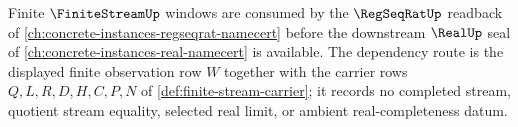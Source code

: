 Finite $\FiniteStreamUp$ windows are consumed by the $\RegSeqRatUp$ readback of \autoref{ch:concrete-instances-regseqrat-namecert} before the downstream $\RealUp$ seal of \autoref{ch:concrete-instances-real-namecert} is available. The dependency route is the displayed finite observation row $W$ together with the carrier rows $Q,L,R,D,H,C,P,N$ of \autoref{def:finite-stream-carrier}; it records no completed stream, quotient stream equality, selected real limit, or ambient real-completeness datum.
